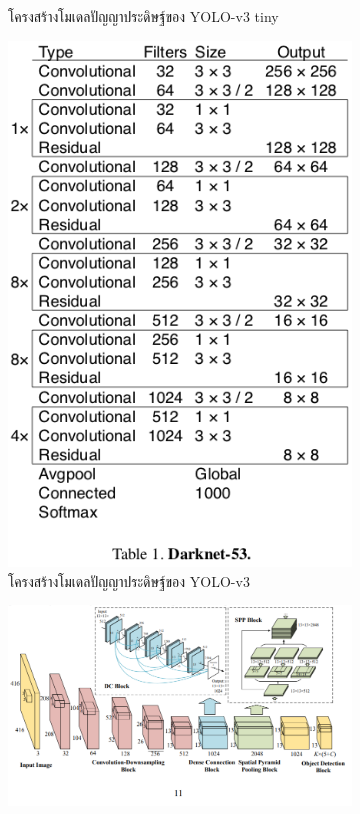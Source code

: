 \begin{figure}[!ht]
\begin{subfigure}[b]{0.2\textwidth}
	 \caption{โครงสร้างโมเดลปัญญาประดิษฐ์ของ YOLO-v3 tiny}
        \label{fig:tiny}
    \end{subfigure}
    \begin{subfigure}[b]{0.3\textwidth}
        \centering
        \includegraphics[width=\textwidth]{chapter2/images/yolo_darknet.png}
	 \caption{โครงสร้างโมเดลปัญญาประดิษฐ์ของ YOLO-v3}
       \label{fig:darknet}
    \end{subfigure}
    \begin{subfigure}[b]{0.5\textwidth}
        \centering
        \includegraphics[width=\textwidth]{chapter2/images/yolo_spp.png}

\end{subfigure}
\end{figure}
